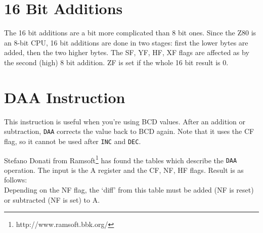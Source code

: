 \documentclass[oneside,a4paper]{book}
\begin{document}
\section{16 Bit Additions}

The 16 bit additions are a bit more complicated than 8 bit ones. Since the 
Z80 is an 8-bit CPU, 16 bit additions are done in two stages: first the 
lower bytes are added, then the two higher bytes. The SF, YF, HF, XF flags 
are affected as by the second (high) 8 bit addition. ZF is set if the whole 
16 bit result is 0.

\section{DAA Instruction}
\label{daa}

This instruction is useful when you're using BCD values. After an addition
or subtraction, {\tt DAA} corrects the value back to BCD again.  Note that 
it uses the CF flag, so it cannot be used after {\tt INC} and {\tt DEC}.

Stefano Donati from Ramsoft\footnote{http://www.ramsoft.bbk.org/} has
found the tables which describe the {\tt DAA} operation. The input is
the A register and the CF, NF, HF flags. Result is as follows: \\[2ex]


Depending on the NF flag, the `diff' from this table must be added (NF is
reset) or subtracted (NF is set) to A.\\[2ex]

 
\end{document}
